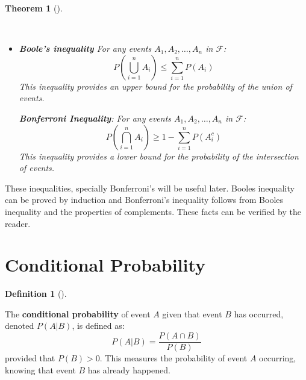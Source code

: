 \documentclass[
  letterpaper,
  DIV=11,
  numbers=noendperiod]{scrreport}
\theoremstyle{definition}
\theoremstyle{plain}
\theoremstyle{definition}
\newtheorem{definition}{Definition}[chapter]
\theoremstyle{plain}
\newtheorem{theorem}{Theorem}[chapter]
\theoremstyle{remark}
\begin{document}
\begin{tcolorbox}[enhanced jigsaw, breakable, opacityback=0, leftrule=.75mm, colback=white, bottomtitle=1mm, coltitle=black, toptitle=1mm, titlerule=0mm, bottomrule=.15mm, colframe=quarto-callout-note-color-frame, title={Boole and Bonferroni inequalities}, opacitybacktitle=0.6, colbacktitle=quarto-callout-note-color!10!white, rightrule=.15mm, arc=.35mm, toprule=.15mm, left=2mm]

\begin{theorem}[]\protect\hypertarget{thm-boole-bonferroni}{}\label{thm-boole-bonferroni}

~

\begin{itemize}
\item
  \textbf{Boole's inequality} For any events \(A_1, A_2, \ldots, A_n\)
  in \(\mathcal F\):
  \[ P\left(\bigcup_{i=1}^n A_i\right) \le \sum_{i=1}^n P(A_i) \] This
  inequality provides an upper bound for the probability of the union of
  events.

  \textbf{Bonferroni Inequality}: For any events
  \(A_1, A_2, \ldots, A_n\) in \(\mathcal F\):
  \[ P\left(\bigcap_{i=1}^n A_i\right) \ge 1 - \sum_{i=1}^n P(A_i^c) \]
  This inequality provides a lower bound for the probability of the
  intersection of events.
\end{itemize}

\end{theorem}

\end{tcolorbox}

These inequalities, specially Bonferroni's will be useful later. Booles
inequality can be proved by induction and Bonferroni's inequality
follows from Booles inequality and the properties of complements. These
facts can be verified by the reader.

\section{Conditional Probability}\label{conditional-probability}

\begin{tcolorbox}[enhanced jigsaw, breakable, opacityback=0, leftrule=.75mm, colback=white, bottomtitle=1mm, coltitle=black, toptitle=1mm, titlerule=0mm, bottomrule=.15mm, colframe=quarto-callout-note-color-frame, title={Conditional Probability}, opacitybacktitle=0.6, colbacktitle=quarto-callout-note-color!10!white, rightrule=.15mm, arc=.35mm, toprule=.15mm, left=2mm]

\begin{definition}[]\protect\hypertarget{def-cond-probability}{}\label{def-cond-probability}

The \textbf{conditional probability} of event \(A\) given that event
\(B\) has occurred, denoted \(P(A|B)\), is defined as:
\[ P(A|B) = \frac{P(A \cap B)}{P(B)} \] provided that \(P(B) > 0\). This
measures the probability of event \(A\) occurring, knowing that event
\(B\) has already happened.

\end{definition}

\end{tcolorbox}
\end{document}
